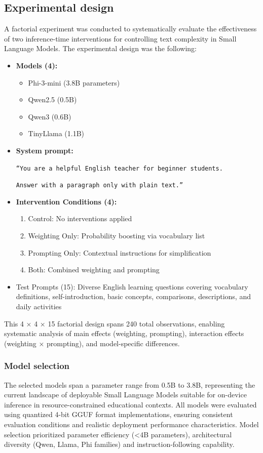 \documentclass[10pt, a4paper]{article}
\begin{document}
\subsection{Experimental design}
A factorial experiment was conducted to systematically evaluate the effectiveness of two inference-time interventions for controlling text complexity in Small Language Models. The experimental design was the following:
\begin{itemize}
    \item \textbf{Models (4):} 
    \begin{itemize}
        \item Phi-3-mini (3.8B parameters) 
        \item Qwen2.5 (0.5B) 
        \item Qwen3 (0.6B) 
        \item  TinyLlama (1.1B)  
    \end{itemize}
    \item \textbf{System prompt:} 
    
    \texttt{``You are a helpful English teacher for beginner students.} 
    
    \texttt{Answer with a paragraph only with plain text.''}
    \item \textbf{Intervention Conditions (4):} 
    \begin{enumerate}
        \item Control: No interventions applied
        \item Weighting Only: Probability boosting via vocabulary list
        \item Prompting Only: Contextual instructions for simplification
        \item Both: Combined weighting and prompting
    \end{enumerate}
    \item Test Prompts (15): Diverse English learning questions covering vocabulary definitions, self-introduction, basic concepts, comparisons, descriptions, and daily activities
\end{itemize}

This 4 × 4 × 15 factorial design spans 240 total observations, enabling systematic analysis of main effects (weighting, prompting), interaction effects (weighting × prompting), and model-specific differences.

\subsubsection{Model selection}
The selected models span a parameter range from 0.5B to 3.8B, representing the current landscape of deployable Small Language Models suitable for on-device inference in resource-constrained educational contexts. All models were evaluated using quantized 4-bit GGUF format implementations, ensuring consistent evaluation conditions and realistic deployment performance characteristics. Model selection prioritized parameter efficiency (<4B parameters), architectural diversity (Qwen, Llama, Phi families) and instruction-following capability.
\end{document}
